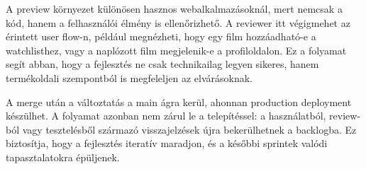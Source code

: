 A preview környezet különösen hasznos webalkalmazásoknál, mert nemcsak a kód, hanem a felhasználói élmény is ellenőrizhető. A reviewer itt végigmehet az érintett user flow-n, például megnézheti, hogy egy film hozzáadható-e a watchlisthez, vagy a naplózott film megjelenik-e a profiloldalon. Ez a folyamat segít abban, hogy a fejlesztés ne csak technikailag legyen sikeres, hanem termékoldali szempontból is megfeleljen az elvárásoknak.

A merge után a változtatás a main ágra kerül, ahonnan production deployment készülhet. A folyamat azonban nem zárul le a telepítéssel: a használatból, review-ból vagy tesztelésből származó visszajelzések újra bekerülhetnek a backlogba. Ez biztosítja, hogy a fejlesztés iteratív maradjon, és a későbbi sprintek valódi tapasztalatokra épüljenek.
